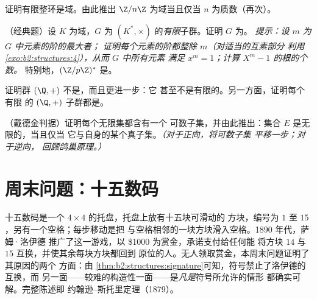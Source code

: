 \begin{exercise}[$\star\star\star$]\label{exo:b2:structures:9}
证明有限整环是域。由此推出
$\Z/n\Z$ 为域当且仅当 $n$ 为质数（再次）。
\end{exercise}

\begin{exercise}[$\star\star\star$]\label{exo:b2:structures:10}
（经典题）设 $K$ 为域，$G$ 为
$(K^*, \times)$ 的\emph{有限}子群。证明 $G$ 为。
\emph{提示：设 $m$ 为 $G$ 中元素的阶的最大者；
证明每个元素的阶都整除 $m$（对适当的互素部分
利用\cref{exo:b2:structures:4}），从而 $G$ 中所有元素
满足 $x^m = 1$；计算 $X^m - 1$ 的根的个数。}
特别地，$(\Z/p\Z)^*$ 是。
\end{exercise}

\begin{exercise}[$\star\star\star$]\label{exo:b2:structures:11}
证明群 $(\Q, +)$ 不是，而且更进一步：它
甚至不是有限的。另一方面，证明每个有限
的 $(\Q, +)$ 子群都是。
\end{exercise}

\begin{exercise}[$\star\star$]\label{exo:b2:structures:12}
（戴德金判据）证明每个无限集都含有一个
可数子集，并由此推出：集合 $E$ 是无限的，当且仅当
它与自身的某个真子集。\emph{（对于正向，将可数子集
平移一步；对于逆向，
回顾鸽巢原理。）}
\end{exercise}

\section{周末问题：十五数码}

十五数码是一个 $4 \times 4$ 的托盘，托盘上放有十五块可滑动的
方块，编号为 $1$ 至 $15$，另有一个空格；每步移动是把
与空格相邻的一块方块滑入空格。1890 年代，萨姆·洛伊德
推广了这一游戏，以 \$1000 为赏金，承诺支付给任何能
将方块 $14$ 与 $15$ 互换，并使其余每块方块都回到
原位的人。无人领取赏金，本周末问题证明了其原因的两个
方面：由
\cref{thm:b2:structures:signature}可知，符号禁止了洛伊德的互换，而
另一面——较难的构造性一面——是\emph{凡是}符号所允许的情形
都确实可解。完整陈述即
约翰逊–斯托里定理（1879）。

